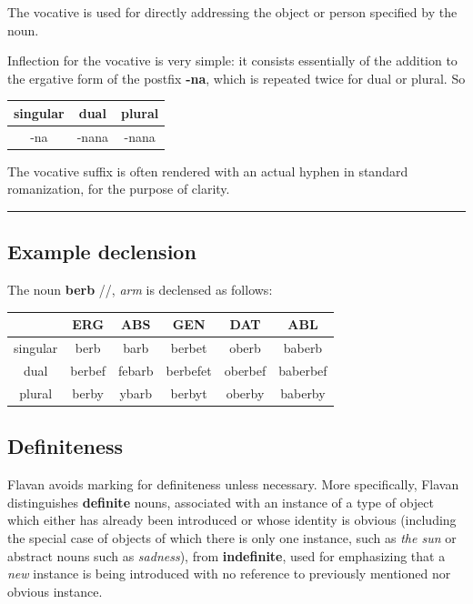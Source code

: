 \documentclass[10pt,oneside]{memoir}
\newcommand{\ipa}[1]{/\textipa{#1}/}
\begin{document}
\begin{multicols}{2}
The vocative is used for directly addressing the object or person specified by the noun.

\begin{minipage}{\columnwidth}

Inflection for the vocative is very simple: it consists essentially of the addition to the ergative form of the postfix \textbf{-na}, which is repeated twice for dual or plural. So\\

\begin{tabular}[]{c | c  | c}
    singular & dual & plural\\
    \hline
    -na & -nana & -nana
\end{tabular}

\end{minipage}

The vocative suffix is often rendered with an actual hyphen in standard romanization, for the purpose of clarity.


\vfill\null
\columnbreak

\end{multicols}
\hrule
\subsection{Example declension}

The noun \textbf{berb} \ipa{bErb}, \emph{arm} is declensed as follows:

\begin{center}
    \begin{tabular}[]{c|| c| c| c| c |c}
            & ERG & ABS & GEN & DAT & ABL \\
            \hline
    singular& berb & barb & berbet & oberb & baberb \\
    dual & berbef & febarb & berbefet & oberbef & baberbef\\
    plural & berby & ybarb & berbyt & oberby & baberby
    \end{tabular}
\end{center}

\subsection{Definiteness}

Flavan avoids marking for definiteness unless necessary. More specifically, Flavan distinguishes \textbf{definite} nouns, associated with an instance of a type of object which either has already been introduced or whose identity is obvious (including the special case of objects of which there is only one instance, such as \emph{the sun} or abstract nouns such as \emph{sadness}), from \textbf{indefinite}, used for emphasizing that a \emph{new} instance is being introduced with no reference to previously mentioned nor obvious instance.
\end{document}
